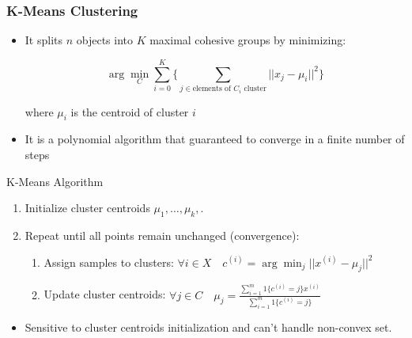 \documentclass{beamer}
\begin{document}
\begin{frame}
	\frametitle{K-Means Clustering}
	\begin{itemize}
		\item It splits $n$ objects into $K$ maximal cohesive groups by minimizing: \begin{scriptsize}
			$$\arg \min_C\sum_{i=0}^K \Biggl\{ \sum_{j \in \text{elements of } C_i\text{ cluster}} ||x_j - \mu_i||^2 \Biggr\}$$
		\end{scriptsize}
		where $\mu_i$ is the centroid of cluster $i$
		\item It is a polynomial algorithm that guaranteed to converge in a finite number of steps
		
	\end{itemize}
	\begin{block}{K-Means Algorithm}
		\begin{enumerate}
			
			\item Initialize cluster centroids $\mu_1, \dots, \mu_k,$.
			\item Repeat until all points remain unchanged (convergence):
			
			\begin{enumerate}
				\item Assign samples to clusters:  $\forall i\in X \quad c^{(i)} = \arg\min_j \vert\vert x^{(i)}-\mu_j\vert\vert^2$
				\item Update cluster centroids:  $\forall j\in C \quad \mu_j = \frac{\sum_{i=1}^m 1\{c^{(i)} = j\}x^{(i)}}{\sum_{i=1}^m 1\{c^{(i)} = j\}}$
			\end{enumerate}
		\end{enumerate}
	\end{block}
	\begin{itemize}
		\item Sensitive to cluster centroids initialization and can't handle non-convex set.
	\end{itemize}

\end{frame}
\end{document}
